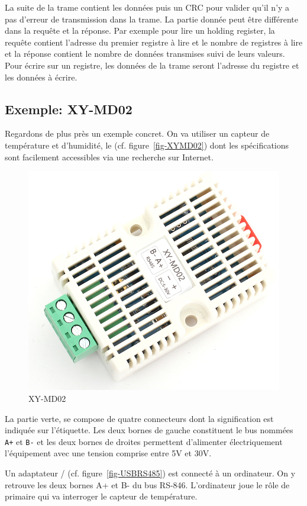     \vspace{1em}

La suite de la trame contient les données puis un \ac{CRC} pour valider qu'il n'y a pas d'erreur de transmission dans la trame. La partie donnée peut être différente dans la requête et la réponse. Par exemple pour lire un holding register, la requête contient l'adresse du premier registre à lire et le nombre de registres à lire et la réponse contient le nombre de données transmises suivi de leurs valeurs. Pour écrire sur un registre, les données de la trame seront l'adresse du registre et les données à écrire.

\subsection{Exemple: XY-MD02}


Regardons de plus près un exemple concret. On va utiliser un capteur de température et d'humidité, le  (cf. figure~\vref{fig-XYMD02}) dont les spécifications sont facilement accessibles via une recherche sur Internet. 

\begin{figure}[tbp]
\centerline{\includegraphics[width=0.5\columnwidth]{Pictures/XY-MD02.png}}
\caption{XY-MD02}
\label{fig-XYMD02}
\end{figure}

La partie verte, se compose de quatre connecteurs dont la signification est indiquée sur l'étiquette. Les deux bornes de gauche constituent le bus  nommées \texttt{A+} et \texttt{B-} et les deux bornes de droites permettent d'alimenter électriquement l'équipement avec une tension comprise entre 5V et 30V.

    \vspace{1em}


Un adaptateur / (cf. figure~\vref{fig-USBRS485}) est connecté à un ordinateur. On y retrouve les deux bornes A+ et B- du bus RS-846. L'ordinateur joue le rôle de primaire qui va interroger le capteur de température.  

